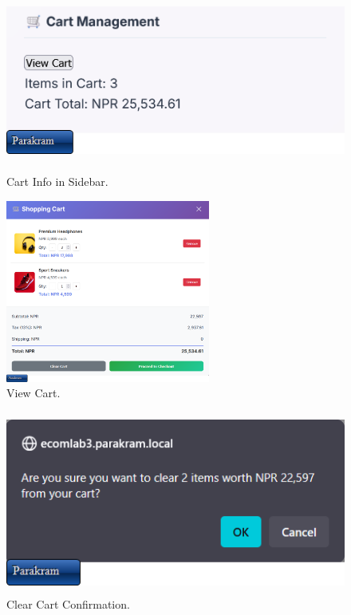 \documentclass[a4paper,12pt]{article}
\begin{document}
\begin{figure}[H]
  \centering
  \includegraphics[width=\textwidth,height=6cm,keepaspectratio]{images/output4.png}
  \caption{Cart Info in Sidebar.}
  \label{fig:img4}
\end{figure}

\begin{figure}[H]
  \centering
  \includegraphics[width=\textwidth,height=6cm,keepaspectratio]{images/output5.png}
  \caption{View Cart.}
  \label{fig:img5}
\end{figure}

\begin{figure}[H]
  \centering
  \includegraphics[width=\textwidth,height=6cm,keepaspectratio]{images/output6.png}
  \caption{Clear Cart Confirmation.}
  \label{fig:img6}
\end{figure}
\end{document}
